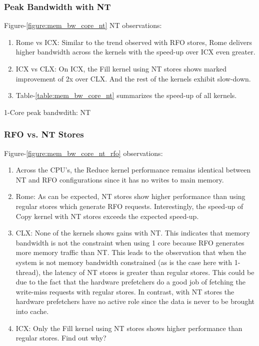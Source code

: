 \documentclass{article}
\begin{document}
\subsubsection{Peak Bandwidth with NT}

Figure-\ref{figure:mem_bw_core_nt} NT observations:
\begin{enumerate}
\item Rome vs ICX: Similar to the trend observed with RFO stores, Rome delivers higher bandwidth across the kernels with the speed-up over ICX even greater. 
\item ICX vs CLX: On ICX, the Fill kernel using NT stores shows marked improvement of 2x over CLX. And the rest of the kernels exhibit slow-down.
\item Table-\ref{table:mem_bw_core_nt} summarizes the speed-up of all kernels.
\end{enumerate}


\begin{table}[h!]
\centering

\caption{1-Core peak bandwdith: NT}
\label{table:mem_bw_core_nt}
\end{table}

\subsubsection{RFO vs. NT Stores}

Figure-\ref{figure:mem_bw_core_nt_rfo} observations:
\begin{enumerate}
\item Across the CPU's, the Reduce kernel performance remains identical between NT and RFO configurations since it has no writes to main memory.
\item Rome: As can be expected, NT stores show higher performance than using regular stores which generate RFO requests. Interestingly, the speed-up of Copy kernel with NT stores exceeds the expected speed-up.
\item CLX: None of the kernels shows gains with NT. This indicates that memory bandwidth is not the constraint when using 1 core because RFO generates more memory traffic than NT. This leads to the observation that when the system is not memory bandwidth constrained (as is the case here with 1-thread), the latency of NT stores is greater than regular stores. This could be due to the fact that the hardware prefetchers do a good job of fetching the write-miss requests with regular stores. In contrast, with NT stores the hardware prefetchers have no active role since the data is never to be brought into cache.
\item ICX: Only the Fill kernel using NT stores shows higher performance than regular stores. Find out why?
\end{enumerate}
\end{document}
